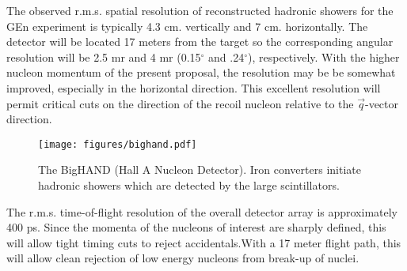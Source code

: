 \documentclass[12pt,letterpaper,oneside]{article}
\begin{document}
The observed r.m.s. 
spatial resolution
of reconstructed hadronic showers for the GEn experiment \cite{GEn-proposal} 
 is typically
4.3 cm. vertically and
7 cm. horizontally.  The detector will be located 17 meters from the
target so the corresponding angular resolution will be 2.5 mr and 4 mr
(0.15$^\circ$ and .24$^\circ$),
respectively.  With the higher nucleon momentum of the present
proposal, the resolution may be be somewhat improved, especially in
the horizontal direction.  This excellent resolution will permit
critical cuts on the direction of the recoil nucleon relative to the 
$\vec q$-vector direction.

\begin{figure}
\begin{center}
\texttt{[image: figures/bighand.pdf]}
\end{center}
\caption{\label{fig_BigHAND}The BigHAND (Hall A Nucleon Detector). 
Iron converters initiate hadronic showers which are detected by
the large scintillators. }
\end{figure}

The r.m.s. time-of-flight resolution of the overall detector array is
approximately 400 ps\cite{Rob_F}.  Since the momenta of the nucleons
of interest are sharply defined, this will allow tight timing cuts to
reject accidentals.With a 17 meter flight path, this
will allow clean rejection of low energy nucleons from break-up of nuclei.


\end{document}
